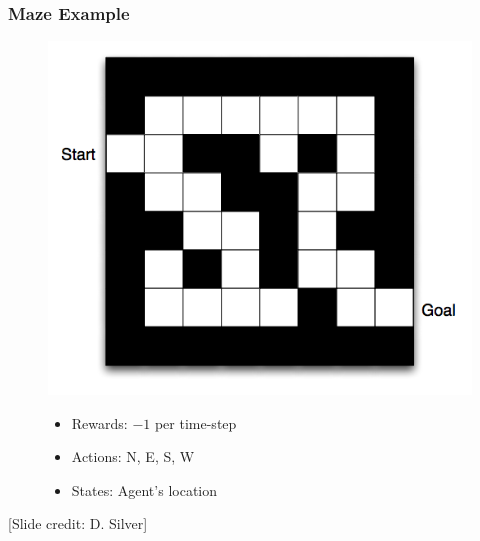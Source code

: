 \documentclass[handout]{beamer}
\begin{document}
\begin{frame}\frametitle{Maze Example}\small
\begin{figure}
\begin{minipage}{0.5\linewidth}
\includegraphics[width=\linewidth]{Figures/maze1}
\end{minipage}
\hspace{3mm}
\begin{minipage}{0.45\linewidth}
\begin{itemize}
\item Rewards:  $-1$ per time-step
\item Actions:  N, E, S, W
\item States:  Agent's location
\end{itemize}
\end{minipage}
\end{figure}

\vspace{12mm}
\scriptsize [Slide credit: D. Silver]
\end{frame}
\end{document}
